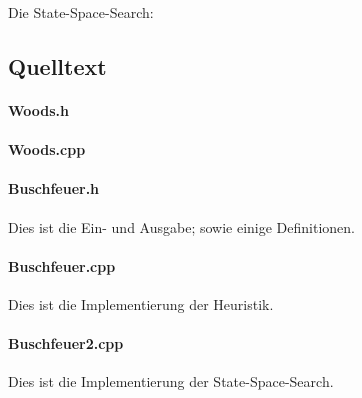 Die State-Space-Search:

{\ttfamily \small

}


\subsection{Quelltext}
\paragraph{Woods.h} \mbox{}

{\small

}

\paragraph{Woods.cpp}\mbox{}

{\small

}

\paragraph{Buschfeuer.h} Dies ist die Ein- und Ausgabe; sowie einige Definitionen.

{\small

}

\paragraph{Buschfeuer.cpp} Dies ist die Implementierung der Heuristik.

{\small

}

\paragraph{Buschfeuer2.cpp} Dies ist die Implementierung der State-Space-Search.

{\small

}
